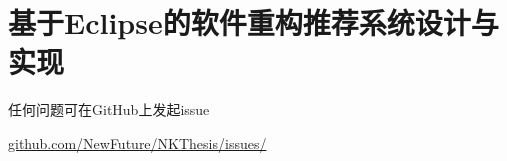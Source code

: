 \chapter{基于Eclipse的软件重构推荐系统设计与实现}

任何问题可在GitHub上发起issue 

\href{https://github.com/NewFuture/NKThesis/issues/new}{github.com/NewFuture/NKThesis/issues/}